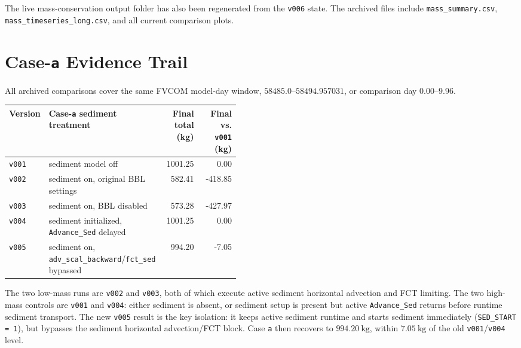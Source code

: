 \documentclass[11pt]{article}
\begin{document}
The live mass-conservation output folder has also been regenerated from the
\texttt{v006} state.  The archived files include \texttt{mass\_summary.csv},
\texttt{mass\_timeseries\_long.csv}, and all current comparison plots.

\section*{Case-\texttt{a} Evidence Trail}
All archived comparisons cover the same FVCOM model-day window,
\(58485.0\)--\(58494.957031\), or comparison day \(0.00\)--\(9.96\).

\begin{table}[h]
\centering
\small
\begin{tabular}{lp{0.45\linewidth}rr}
\toprule
Version & Case-\texttt{a} sediment treatment & Final total (kg) &
Final vs. \texttt{v001} (kg) \\
\midrule
\texttt{v001} & sediment model off & 1001.25 & 0.00 \\
\texttt{v002} & sediment on, original BBL settings & 582.41 & -418.85 \\
\texttt{v003} & sediment on, BBL disabled & 573.28 & -427.97 \\
\texttt{v004} & sediment initialized, \texttt{Advance\_Sed} delayed & 1001.25 & 0.00 \\
\texttt{v005} & sediment on, \texttt{adv\_scal\_backward}/\texttt{fct\_sed}
bypassed & 994.20 & -7.05 \\
\bottomrule
\end{tabular}
\end{table}

The two low-mass runs are \texttt{v002} and \texttt{v003}, both of which execute
active sediment horizontal advection and FCT limiting.  The two high-mass
controls are \texttt{v001} and \texttt{v004}: either sediment is absent, or
sediment setup is present but active \texttt{Advance\_Sed} returns before
runtime sediment transport.  The new \texttt{v005} result is the key isolation:
it keeps active sediment runtime and starts sediment immediately
(\texttt{SED\_START = 1}), but bypasses the sediment horizontal
advection/FCT block.  Case \texttt{a} then recovers to \(994.20~\mathrm{kg}\),
within \(7.05~\mathrm{kg}\) of the old \texttt{v001}/\texttt{v004} level.
\end{document}
